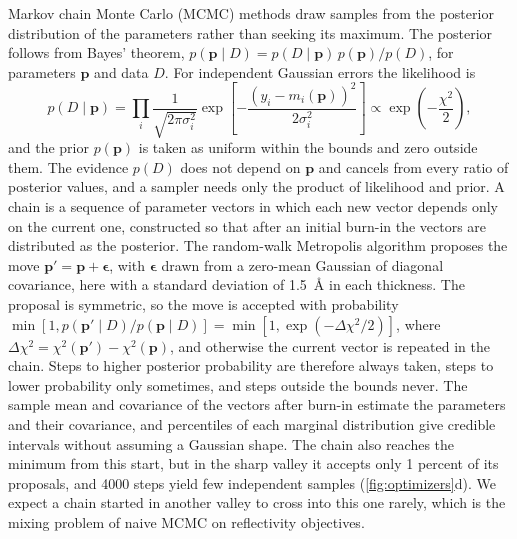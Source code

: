 Markov chain Monte Carlo (MCMC) methods draw samples from the posterior distribution of the parameters rather than seeking its maximum. The posterior follows from Bayes' theorem, \(p(\mathbf{p} \mid D) = p(D \mid \mathbf{p})\,p(\mathbf{p})/p(D)\), for parameters \(\mathbf{p}\) and data \(D\). For independent Gaussian errors the likelihood is
\begin{equation}
p(D \mid \mathbf{p}) = \prod_{i}\frac{1}{\sqrt{2\pi\sigma_{i}^{2}}}\exp\left\lbrack - \frac{\left( y_{i} - m_{i}(\mathbf{p}) \right)^{2}}{2\sigma_{i}^{2}} \right\rbrack \propto \exp\left( - \frac{\chi^{2}}{2} \right),
\label{eq:gaussian-likelihood}
\end{equation}
and the prior \(p(\mathbf{p})\) is taken as uniform within the bounds and zero outside them. The evidence \(p(D)\) does not depend on \(\mathbf{p}\) and cancels from every ratio of posterior values, and a sampler needs only the product of likelihood and prior. A chain is a sequence of parameter vectors in which each new vector depends only on the current one, constructed so that after an initial burn-in the vectors are distributed as the posterior. The random-walk Metropolis algorithm\autocite{metropolisEquationStateCalculations1953} proposes the move \(\mathbf{p}' = \mathbf{p} + \symbf{\epsilon}\), with \(\symbf{\epsilon}\) drawn from a zero-mean Gaussian of diagonal covariance, here with a standard deviation of \qty{1.5}{\angstrom} in each thickness. The proposal is symmetric, so the move is accepted with probability \(\min\left\lbrack 1,p(\mathbf{p}' \mid D)/p(\mathbf{p} \mid D) \right\rbrack = \min\left\lbrack 1,\exp\left( - \Delta\chi^{2}/2 \right) \right\rbrack\), where \(\Delta\chi^{2} = \chi^{2}(\mathbf{p}') - \chi^{2}(\mathbf{p})\), and otherwise the current vector is repeated in the chain. Steps to higher posterior probability are therefore always taken, steps to lower probability only sometimes, and steps outside the bounds never. The sample mean and covariance of the vectors after burn-in estimate the parameters and their covariance, and percentiles of each marginal distribution give credible intervals without assuming a Gaussian shape. The chain also reaches the minimum from this start, but in the sharp valley it accepts only 1 percent of its proposals, and 4000 steps yield few independent samples (\cref{fig:optimizers}d). We expect a chain started in another valley to cross into this one rarely, which is the mixing problem of naive MCMC on reflectivity objectives.\autocite{machidaDevelopmentBayesianInference2024}


